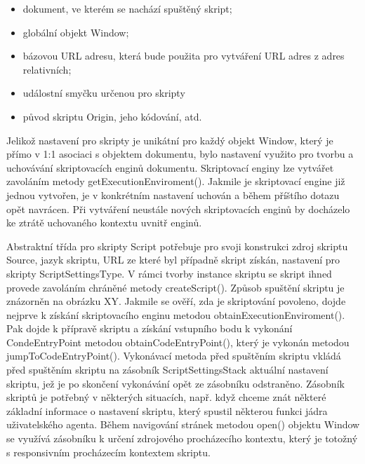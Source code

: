 \begin{itemize}
  \item dokument, ve kterém se nachází spuštěný skript;
  \item globální objekt Window;
  \item bázovou URL adresu, která bude použita pro vytváření URL adres z adres relativních;
  \item událostní smyčku určenou pro skripty
  \item původ skriptu Origin, jeho kódování, atd. 
\end{itemize}

Jelikož nastavení pro skripty je unikátní pro každý objekt Window, který je přímo v 1:1 asociaci s objektem dokumentu, bylo nastavení využito pro tvorbu a uchovávání skriptovacích enginů dokumentu. Skriptovací enginy lze vytvářet zavoláním metody getExecutionEnviroment(). Jakmile je skriptovací engine již jednou vytvořen, je v konkrétním nastavení uchován a během příštího dotazu opět navrácen. Při vytváření neustále nových skriptovacích enginů by docházelo ke ztrátě uchovaného kontextu uvnitř enginů.

Abstraktní třída pro skripty Script potřebuje pro svoji konstrukci zdroj skriptu Source, jazyk skriptu, URL ze které byl případně skript získán, nastavení pro skripty ScriptSettingsType. V rámci tvorby instance skriptu se skript ihned provede zavoláním chráněné metody createScript(). Způsob spuštění skriptu je znázorněn na obrázku XY. Jakmile se ověří, zda je skriptování povoleno, dojde nejprve k získání skriptovacího enginu metodou obtainExecutionEnviroment(). Pak dojde k přípravě skriptu a získání vstupního bodu k vykonání CondeEntryPoint metodou obtainCodeEntryPoint(), který je vykonán metodou jumpToCodeEntryPoint(). Vykonávací metoda před spuštěním skriptu vkládá před spuštěním skriptu na zásobník ScriptSettingsStack aktuální nastavení skriptu, jež je po skončení vykonávání opět ze zásobníku odstraněno. Zásobník skriptů je potřebný v některých situacích, např. když chceme znát některé základní informace o nastavení skriptu, který spustil některou funkci jádra uživatelského agenta. Během navigování stránek metodou open() objektu Window se využívá zásobníku k určení zdrojového procházecího kontextu, který je totožný s responsivním procházecím kontextem skriptu.

